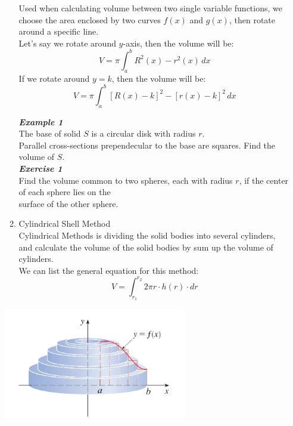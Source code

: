 \documentclass[12px]{article}
\begin{document}
\begin{enumerate}
\begin{enumerate}[(1)]
        \hspace*{2em}Used when calculating volume between two single variable functions, we choose the area enclosed by two curves $f(x)$ and $g(x)$, then rotate around a specific line.\\
        \hspace*{2em}Let’s say we rotate around $y$-axis, then the volume will be:
        $$V=\pi\int_a^bR^2(x)-r^2(x)\,dx$$
        \hspace*{2em}If we rotate around $y=k$, then the volume will be:
        $$V=\pi\int_a^b[R(x)-k]^2-[r(x)-k]^2\,dx$$
        \begin{multicols}{2}
            \textit{\textbf{Example 1}}\\
            The base of solid $S$ is a circular disk with radius $r$.\\Parallel cross-sections prependecular to the base are squares. Find the volume of $S$.\\
            \textit{\textbf{Exercise 1}}\\
            Find the volume common to two spheres, each with radius $r$, if the center of each sphere lies on the\\
            surface of the other sphere.
        \end{multicols}
\newpage        
        \item Cylindrical Shell Method\\
        \hspace*{2em}Cylindrical Methods is dividing the solid bodies into several cylinders, and calculate the volume of the solid bodies by sum up the volume of cylinders.\\
        \hspace*{2em}We can list the general equation for this method:
        $$V=\int_{r_1}^{r_2}2\pi r\cdot h(r)\cdot dr$$
    \end{enumerate}
    \begin{center}
        \includegraphics[width=8cm]{cylinder.png}
    \end{center}\leavevmode

\end{enumerate}
\end{document}
